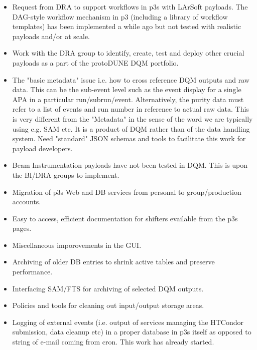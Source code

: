 \documentclass[pdftex,12pt,letter]{article}
\newcommand{\pd}{protoDUNE\xspace}
\begin{document}
\begin{itemize}

\item Request from DRA to support workflows in p3s with LArSoft payloads. The DAG-style workflow mechanism in p3
(including a library of workflow templates) has been implemented a while ago but not tested with realistic payloads and/or at scale.

\item Work with the DRA group to identify, create, test and deploy other crucial payloads as a part of the \pd DQM portfolio.

\item The "basic metadata" issue i.e. how to cross reference DQM outputs and raw data. This can be the sub-event level such as the event
display for a single APA in a particular run/subrun/event. Alternatively, the purity data must refer to a list of events and run number in reference
to actual raw data. This is very different from the "Metadata" in the sense of the word we are typically using e.g. SAM etc.
It is a product of DQM rather than of the data handling system. Need "standard" JSON schemas and tools to facilitate this work for payload developers.

\item Beam Instrumentation payloads have not been tested in DQM. This is upon the BI/DRA groups to implement.

\item Migration of p3s Web and DB services from personal to group/production accounts.

\item Easy to access, efficient documentation for shifters evailable from the p3s pages.

\item Miscellaneous imporovements in the GUI.

\item Archiving of older DB entries to shrink active tables and preserve performance.

\item Interfacing SAM/FTS for archiving of selected DQM outputs.

\item Policies and tools for cleaning out input/output storage areas.

\item Logging of external events (i.e. output of services managing the HTCondor submission, data cleanup etc) in a proper database
in p3s itself as opposed to string of e-mail coming from cron. This work has already started.

\end{itemize}
\end{document}
